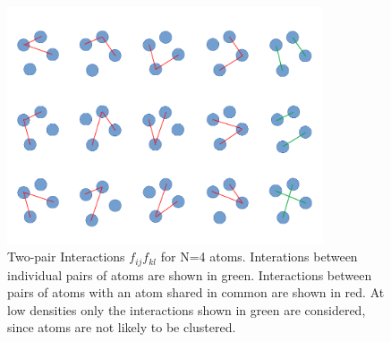 \documentclass[double,12pt]{beavtex}
\begin{document}
  \begin{figure}[h!]
    \centering
    \includegraphics[height=7cm]{figs/diagrammic.pdf}
    \caption{Two-pair Interactions $f_{ij}f_{kl}$ for N=4 atoms. Interations 
    between individual pairs of atoms are shown in green. Interactions 
    between pairs of atoms with an atom shared in common are shown in red. 
    At low densities only the interactions shown in green are considered, 
    since atoms are not likely to be clustered.}
    \label{fig:diagrammic}
  \end{figure}
\end{document}
